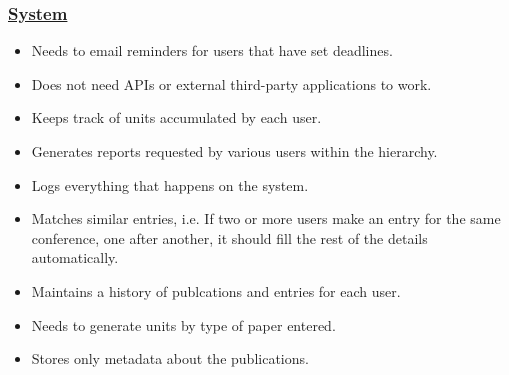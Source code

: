 \documentclass[a4paper,12pt]{article}
\begin{document}
\subsubsection{\underline{System}}
\begin{itemize}
\item Needs to email reminders for users that have set deadlines.
\item Does not need APIs or external third-party applications to work.
\item Keeps track of units accumulated by each user.
\item Generates reports requested by various users within the hierarchy.
\item Logs everything that happens on the system.
\item Matches similar entries, i.e. If two or more users make an entry for the same conference, one after another, it should fill the rest of the details automatically.
\item Maintains a history of publcations and entries for each user.
\item Needs to generate units by type of paper entered.
\item Stores only metadata about the publications.
\end{itemize}
\end{document}
